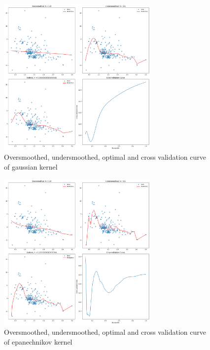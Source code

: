 \begin{figure}[H]

	\centering
	\includegraphics[width=0.7\textwidth]{../images/4/gaussian_kernel_regression.png}
	\caption{Oversmoothed, undersmoothed, optimal and cross validation curve of gaussian kernel}
\end{figure}

\begin{figure}[H]

	\centering
	\includegraphics[width=0.7\textwidth]{../images/4/epanechnikov_kernel_regression.png}
	\caption{Oversmoothed, undersmoothed, optimal and cross validation curve of epanechnikov kernel}
\end{figure}






